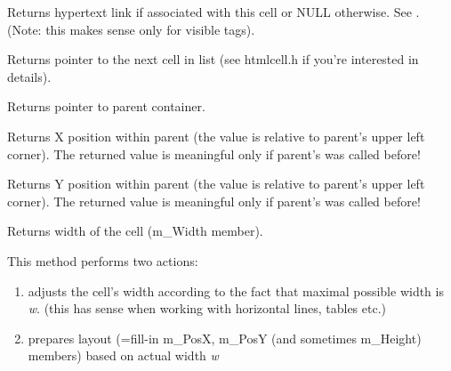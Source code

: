 Returns hypertext link if associated with this cell or NULL otherwise.
See .
(Note: this makes sense only for visible tags).



\label{wxhtmlcellgetnext}


Returns pointer to the next cell in list (see htmlcell.h if you're
interested in details).

\label{wxhtmlcellgetparent}


Returns pointer to parent container.

\label{wxhtmlcellgetposx}


Returns X position within parent (the value is relative to parent's
upper left corner). The returned value is meaningful only if
parent's  was called before!

\label{wxhtmlcellgetposy}


Returns Y position within parent (the value is relative to parent's
upper left corner). The returned value is meaningful only if
parent's  was called before!

\label{wxhtmlcellgetwidth}


Returns width of the cell (m\_Width member).

\label{wxhtmlcelllayout}


This method performs two actions:

\begin{enumerate}\itemsep=0pt
\item adjusts the cell's width according to the fact that maximal possible width is {\it w}.
(this has sense when working with horizontal lines, tables etc.)
\item prepares layout (=fill-in m\_PosX, m\_PosY (and sometimes m\_Height) members)
based on actual width {\it w}
\end{enumerate}

